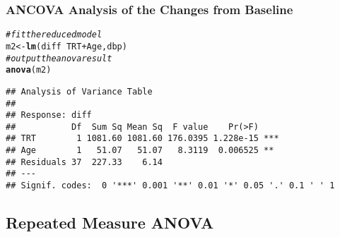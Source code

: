 \documentclass[table,10pt]{beamer}\usepackage[]{graphicx}\usepackage[]{color}
\makeatletter
\newcommand{\hlcom}[1]{\textcolor[rgb]{0.678,0.584,0.686}{\textit{#1}}}%
\newcommand{\hlopt}[1]{\textcolor[rgb]{0,0,0}{#1}}%
\newcommand{\hlstd}[1]{\textcolor[rgb]{0.345,0.345,0.345}{#1}}%
\newcommand{\hlkwb}[1]{\textcolor[rgb]{0.69,0.353,0.396}{#1}}%
\newcommand{\hlkwd}[1]{\textcolor[rgb]{0.737,0.353,0.396}{\textbf{#1}}}%
\newenvironment{kframe}{%
 \def\at@end@of@kframe{}%
 \ifinner\ifhmode%
  \def\at@end@of@kframe{\end{minipage}}%
  \begin{minipage}{\columnwidth}%
 \fi\fi%
 \def\FrameCommand##1{\hskip\@totalleftmargin \hskip-\fboxsep
 \colorbox{shadecolor}{##1}\hskip-\fboxsep
     \hskip-\linewidth \hskip-\@totalleftmargin \hskip\columnwidth}%
 \MakeFramed {\advance\hsize-\width
   \@totalleftmargin\z@ \linewidth\hsize
   \@setminipage}}%
 {\par\unskip\endMakeFramed%
 \at@end@of@kframe}
\newenvironment{knitrout}{}{} %
\makeatother
\begin{document}
\begin{CJK*}{UTF8}{gbsn}
\begin{frame}[t,containsverbatim]
\frametitle{ANCOVA Analysis of the Changes from Baseline}
\begin{knitrout}\footnotesize
{}\color{fgcolor}\begin{kframe}
\begin{alltt}
\hlcom{# fit the reduced model}
\hlstd{m2} \hlkwb{<-} \hlkwd{lm}\hlstd{(diff} \hlopt{~} \hlstd{TRT} \hlopt{+} \hlstd{Age, dbp)}
\hlcom{# output the anova result}
\hlkwd{anova}\hlstd{(m2)}
\end{alltt}
\begin{verbatim}
## Analysis of Variance Table
## 
## Response: diff
##           Df  Sum Sq Mean Sq  F value    Pr(>F)    
## TRT        1 1081.60 1081.60 176.0395 1.228e-15 ***
## Age        1   51.07   51.07   8.3119  0.006525 ** 
## Residuals 37  227.33    6.14                       
## ---
## Signif. codes:  0 '***' 0.001 '**' 0.01 '*' 0.05 '.' 0.1 ' ' 1
\end{verbatim}
\end{kframe}
\end{knitrout}
\end{frame}

\subsection{Repeated Measure ANOVA}


\end{CJK*}
\end{document}
